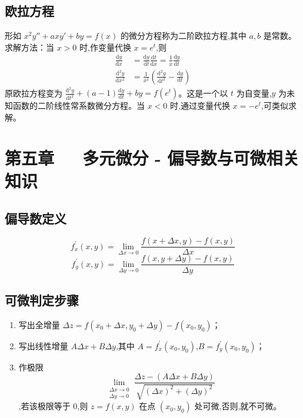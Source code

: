 \documentclass[UTF8]{ctexart}
\theoremstyle{remark}
\begin{document}
		\subsection{欧拉方程}
		形如 \(x^{2}y'' + axy' + by = f(x)\) 的微分方程称为二阶欧拉方程,其中 \(a, b\) 是常数。
		求解方法：当 \(x > 0\) 时,作变量代换 \(x = e^{t}\),则
		\begin{align*}
			\frac{\mathrm{d}y}{\mathrm{d}x}&=\frac{\mathrm{d}y}{\mathrm{d}t}\frac{\mathrm{d}t}{\mathrm{d}x}=\frac{1}{x}\frac{\mathrm{d}y}{\mathrm{d}t}\\
			\frac{\mathrm{d}^{2}y}{\mathrm{d}x^{2}}&=\frac{1}{x^{2}}\left(\frac{\mathrm{d}^{2}y}{\mathrm{d}t^{2}}-\frac{\mathrm{d}y}{\mathrm{d}t}\right)
		\end{align*}
		原欧拉方程变为 \(\frac{\mathrm{d}^{2}y}{\mathrm{d}t^{2}}+(a - 1)\frac{\mathrm{d}y}{\mathrm{d}t}+by = f(e^{t})\)。这是一个以 \(t\) 为自变量,\(y\) 为未知函数的二阶线性常系数微分方程。当 \(x < 0\) 时,通过变量代换 \(x = -e^{t}\),可类似求解。
		
		\section{{第五章~~~多元微分 - 偏导数与可微相关知识}}
		
		\subsection{偏导数定义}
		\[
		f_x^{\prime}(x,y)=\lim_{\Delta x \to 0}\frac{f(x + \Delta x,y)-f(x,y)}{\Delta x}
		\]
		\[
		f_y^{\prime}(x,y)=\lim_{\Delta y \to 0}\frac{f(x,y + \Delta y)-f(x,y)}{\Delta y}
		\]
		
		\subsection{可微判定步骤}
		\begin{enumerate}
			\item 写出全增量 \(\Delta z = f(x_0+\Delta x,y_0+\Delta y)-f(x_0,y_0)\)；
			\item 写出线性增量 \(A\Delta x + B\Delta y\),其中 \(A = f_x^{\prime}(x_0,y_0)\),\(B = f_y^{\prime}(x_0,y_0)\)；
			\item 作极限 \[\lim_{\substack{\Delta x \to 0\\\Delta y \to 0}}\frac{\Delta z-(A\Delta x + B\Delta y)}{\sqrt{(\Delta x)^2+(\Delta y)^2}}\],若该极限等于 \(0\),则 \(z = f(x,y)\) 在点 \((x_0,y_0)\) 处可微,否则,就不可微。
		\end{enumerate}
		
\end{document}
